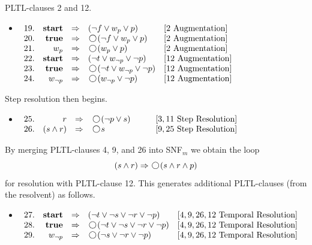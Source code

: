 \documentclass[nohyperref]{acmtrans2f}
\newcommand{\next}{\!\raisebox{-.2ex}{ %
                        \mbox{\unitlength=0.9ex
                        \begin{picture}(2,2)
                        \linethickness{0.06ex}
                        \put(1,1){\circle{2}} %
                        \end{picture}}}       %
                        \,}
\def\unless{\hbox{$\,\cal W \,$}}
\let\imp=\Rightarrow
\def\ltrue{\hbox{\rm\bf true}}
\def\lstart{\hbox{\rm\bf start}}
\begin{document}
PLTL-clauses 2 and 12.
\begin{itemize}
\item[] $\begin{array}[t]{rrcll}
19. & \lstart & \imp & ( \neg f \lor w_{p} \lor p) &
[2 \mbox{ Augmentation}] \\
20. & \ltrue & \imp & \next( \neg f \lor w_{p} \lor p) &
[2 \mbox{ Augmentation}] \\
21. & w_{p} & \imp & \next(w_{p} \lor p) &
[2 \mbox{ Augmentation}] \\
22. & \lstart & \imp & ( \neg t \lor w_{\neg p} \lor \neg p) &
[12 \mbox{ Augmentation}] \\
23. & \ltrue & \imp & \next( \neg t \lor w_{\neg p} \lor \neg p) &
[12 \mbox{ Augmentation}] \\
24. & w_{\neg p} & \imp & \next(w_{\neg p} \lor \neg p) &
[12 \mbox{ Augmentation}] \\
\end{array}$
\end{itemize}
%
Step resolution then begins.
\begin{itemize}
\item[] $\begin{array}[t]{rrcll}
25. & r & \imp & \next(\neg p \lor s)\qquad & [3,11 \mbox{ Step Resolution}] \\
26. & (s \land r) & \imp & \next s & [9,25 \mbox{ Step Resolution}] \\
\end{array}$
\end{itemize}
%
By merging PLTL-clauses 4, 9, and 26 into SNF$_m$ we obtain the loop
$$
(s \land r) \imp \next (s \land r \land p)
$$
for resolution with PLTL-clause 12. 
This generates additional PLTL-clauses (from the resolvent) as follows.
\begin{itemize}
\item[] $\begin{array}[t]{rrcll}
27. & \lstart & \imp & ( \neg t \lor \neg s \lor \neg r \lor \neg p) &
[4,9,26,12 \mbox{ Temporal Resolution}] \\
28. & \ltrue & \imp & \next( \neg t \lor \neg s \lor \neg r \lor \neg p) &
[4,9,26,12 \mbox{ Temporal Resolution}] \\
29. & w_{\neg p} & \imp & \next( \neg s \lor \neg r \lor \neg p) &
[4,9,26,12 \mbox{ Temporal Resolution}] \\
\end{array}$
\end{itemize}
\end{document}
